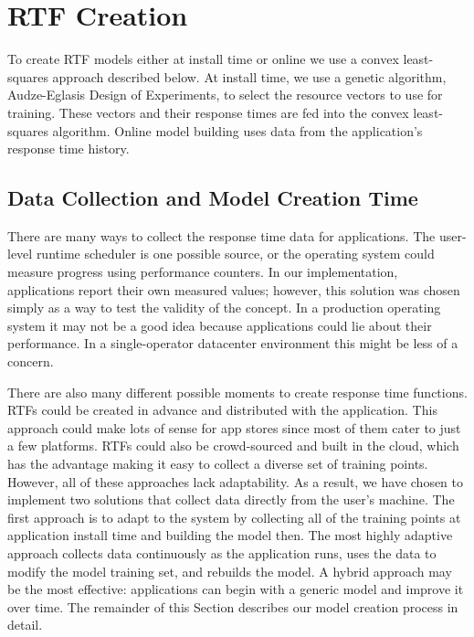  

\section{RTF Creation}\label{rtf_creation}
To create RTF models either at install time or online we use a convex
least-squares approach described below.  At install time, we use a
genetic algorithm, Audze-Eglasis Design of
Experiments\cite{bates-aes03}, to select the resource vectors to use
for training.  These vectors and their response times are fed into the
convex least-squares algorithm. Online model building uses data
from the application's response time history.

\subsection*{Data Collection and Model Creation Time}
There are many ways to collect the response time data for
applications. The user-level runtime scheduler is one possible source,
or the operating system could measure progress using performance
counters.  In our implementation, applications report their own
measured values; however, this solution was chosen simply as a way to
test the validity of the concept.  In a production operating system it
may not be a good idea because applications could lie about their
performance.  In a single-operator datacenter environment this might be less of a concern.

There are also many different possible moments to create response time functions.  RTFs could be created in advance and distributed with the application. This approach could make lots of sense for app stores since most of them cater to just a few platforms. RTFs could also be crowd-sourced and built in the cloud, which has the advantage making it easy to collect a diverse set of training points.  However, all of these approaches lack adaptability.  As a result, we have chosen to implement two solutions that collect data directly from the user's machine.  The first approach is to adapt to the system by collecting all of the training points at application install time and building the model then.  The most highly adaptive approach collects data continuously as the application runs, uses the data to modify the model training set, and rebuilds the model.  A hybrid approach may be the most effective: applications can begin with a generic model and improve it over time. The remainder of this Section describes our model creation process in detail.

